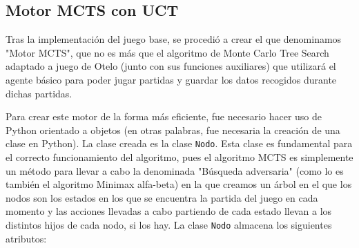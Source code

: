\documentclass[conference]{IEEEtran}
\begin{document}
\subsection{Motor MCTS con UCT}
Tras la implementación del juego base, se procedió a crear el que denominamos "Motor MCTS", que no es más que el algoritmo de Monte Carlo Tree Search adaptado a juego de Otelo (junto con sus funciones auxiliares) que utilizará el agente básico para poder jugar partidas y guardar los datos recogidos durante dichas partidas.

Para crear este motor de la forma más eficiente, fue necesario hacer uso de Python orientado a objetos (en otras palabras, fue necesaria la creación de una clase en Python). La clase creada es la clase \texttt{Nodo}. Esta clase es fundamental para el correcto funcionamiento del algoritmo, pues el algoritmo MCTS es simplemente un método para llevar a cabo la denominada "Búsqueda adversaria" (como lo es también el algoritmo Minimax alfa-beta) en la que creamos un árbol en el que los nodos son los estados en los que se encuentra la partida del juego en cada momento y las acciones llevadas a cabo partiendo de cada estado llevan a los distintos hijos de cada nodo, si los hay. La clase \texttt{Nodo} almacena los siguientes atributos:
\end{document}
